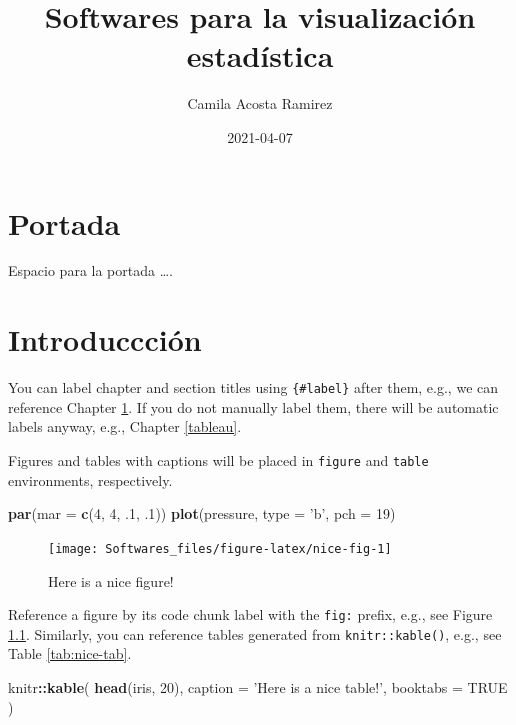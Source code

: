 \documentclass[
]{book}
\title{Softwares para la visualización estadística}
\author{Camila Acosta Ramirez}
\date{2021-04-07}
\newenvironment{Shaded}{\begin{snugshade}}{\end{snugshade}}
\newcommand{\DataTypeTok}[1]{\textcolor[rgb]{0.13,0.29,0.53}{#1}}
\newcommand{\DecValTok}[1]{\textcolor[rgb]{0.00,0.00,0.81}{#1}}
\newcommand{\FloatTok}[1]{\textcolor[rgb]{0.00,0.00,0.81}{#1}}
\newcommand{\KeywordTok}[1]{\textcolor[rgb]{0.13,0.29,0.53}{\textbf{#1}}}
\newcommand{\NormalTok}[1]{#1}
\newcommand{\OperatorTok}[1]{\textcolor[rgb]{0.81,0.36,0.00}{\textbf{#1}}}
\newcommand{\OtherTok}[1]{\textcolor[rgb]{0.56,0.35,0.01}{#1}}
\newcommand{\StringTok}[1]{\textcolor[rgb]{0.31,0.60,0.02}{#1}}
\begin{document}
\maketitle

{
\setcounter{tocdepth}{1}
\tableofcontents
}
\hypertarget{portada}{%
\chapter*{Portada}\label{portada}}

Espacio para la portada \ldots.

\hypertarget{intro}{%
\chapter{Introduccción}\label{intro}}

You can label chapter and section titles using \texttt{\{\#label\}} after them, e.g., we can reference Chapter \ref{intro}. If you do not manually label them, there will be automatic labels anyway, e.g., Chapter \ref{tableau}.

Figures and tables with captions will be placed in \texttt{figure} and \texttt{table} environments, respectively.

\begin{Shaded}
\begin{Highlighting}[]
\KeywordTok{par}\NormalTok{(}\DataTypeTok{mar =} \KeywordTok{c}\NormalTok{(}\DecValTok{4}\NormalTok{, }\DecValTok{4}\NormalTok{, }\FloatTok{.1}\NormalTok{, }\FloatTok{.1}\NormalTok{))}
\KeywordTok{plot}\NormalTok{(pressure, }\DataTypeTok{type =} \StringTok{'b'}\NormalTok{, }\DataTypeTok{pch =} \DecValTok{19}\NormalTok{)}
\end{Highlighting}
\end{Shaded}

\begin{figure}

{\centering \texttt{[image: Softwares\_files/figure-latex/nice-fig-1]} 

}

\caption{Here is a nice figure!}\label{fig:nice-fig}
\end{figure}

Reference a figure by its code chunk label with the \texttt{fig:} prefix, e.g., see Figure \ref{fig:nice-fig}. Similarly, you can reference tables generated from \texttt{knitr::kable()}, e.g., see Table \ref{tab:nice-tab}.

\begin{Shaded}
\begin{Highlighting}[]
\NormalTok{knitr}\OperatorTok{::}\KeywordTok{kable}\NormalTok{(}
  \KeywordTok{head}\NormalTok{(iris, }\DecValTok{20}\NormalTok{), }\DataTypeTok{caption =} \StringTok{'Here is a nice table!'}\NormalTok{,}
  \DataTypeTok{booktabs =} \OtherTok{TRUE}
\NormalTok{)}
\end{Highlighting}
\end{Shaded}
\end{document}
